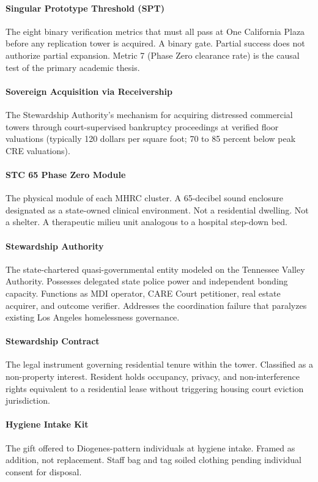 {\paragraph{Singular Prototype Threshold (SPT)} The eight binary verification metrics that must all pass at One California Plaza before any replication tower is acquired. A binary gate. Partial success does not authorize partial expansion. Metric 7 (Phase Zero clearance rate) is the causal test of the primary academic thesis.

\paragraph{Sovereign Acquisition via Receivership} The Stewardship Authority's mechanism for acquiring distressed commercial towers through court-supervised bankruptcy proceedings at verified floor valuations (typically 120 dollars per square foot; 70 to 85 percent below peak CRE valuations).

\paragraph{STC 65 Phase Zero Module} The physical module of each MHRC cluster. A 65-decibel sound enclosure designated as a state-owned clinical environment. Not a residential dwelling. Not a shelter. A therapeutic milieu unit analogous to a hospital step-down bed.

\paragraph{Stewardship Authority} The state-chartered quasi-governmental entity modeled on the Tennessee Valley Authority. Possesses delegated state police power and independent bonding capacity. Functions as MDI operator, CARE Court petitioner, real estate acquirer, and outcome verifier. Addresses the coordination failure that paralyzes existing Los Angeles homelessness governance.

\paragraph{Stewardship Contract} The legal instrument governing residential tenure within the tower. Classified as a non-property interest. Resident holds occupancy, privacy, and non-interference rights equivalent to a residential lease without triggering housing court eviction jurisdiction.

\paragraph{Hygiene Intake Kit} The gift offered to Diogenes-pattern individuals at hygiene intake. Framed as addition, not replacement. Staff bag and tag soiled clothing pending individual consent for disposal.

}
